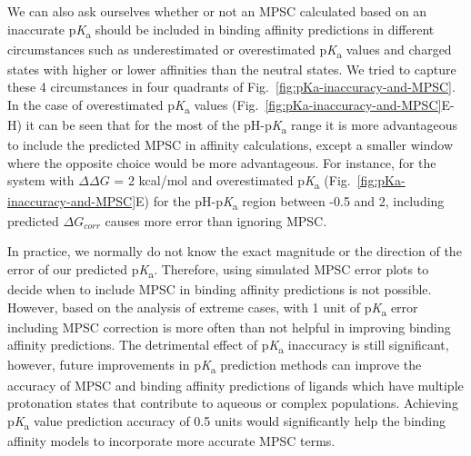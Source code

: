 \documentclass[9pt,lineno,final]{elife}
\newcommand{\pKa}{p\textit{K}\textsubscript{a}}
\begin{document}
We can also ask ourselves whether or not an MPSC calculated based on an inaccurate \pKa{} should be included in binding affinity predictions in different circumstances such as underestimated or overestimated \pKa{} values and charged states with higher or lower affinities than the neutral states. We tried to capture these 4 circumstances in four quadrants of Fig.~\ref{fig:pKa-inaccuracy-and-MPSC}. In the case of overestimated \pKa{} values (Fig.~\ref{fig:pKa-inaccuracy-and-MPSC}E-H) it can be seen that for the most of the pH-\pKa{} range it is more advantageous to include the predicted MPSC in affinity calculations, except a smaller window where the opposite choice would be more advantageous. For instance, for the system with $\Delta\Delta G$ = 2 kcal/mol and overestimated \pKa{} (Fig.~\ref{fig:pKa-inaccuracy-and-MPSC}E) for the pH-\pKa{} region between -0.5 and 2, including predicted $\Delta G_{corr}$ causes more error than ignoring MPSC. 

In practice, we normally do not know the exact magnitude or the direction of the error of our predicted \pKa{}. Therefore, using simulated MPSC error plots to decide when to include MPSC in binding affinity predictions is not possible. However, based on the analysis of extreme cases, with 1 unit of \pKa{} error including MPSC correction is more often than not helpful in improving binding affinity predictions. The detrimental effect of \pKa{} inaccuracy is still significant, however, future improvements in \pKa{} prediction methods can improve the accuracy of MPSC and binding affinity predictions of ligands which have multiple protonation states that contribute to aqueous or complex populations. Achieving \pKa{} value prediction accuracy of 0.5 units would significantly help the binding affinity models to incorporate more accurate MPSC terms.   
\end{document}
